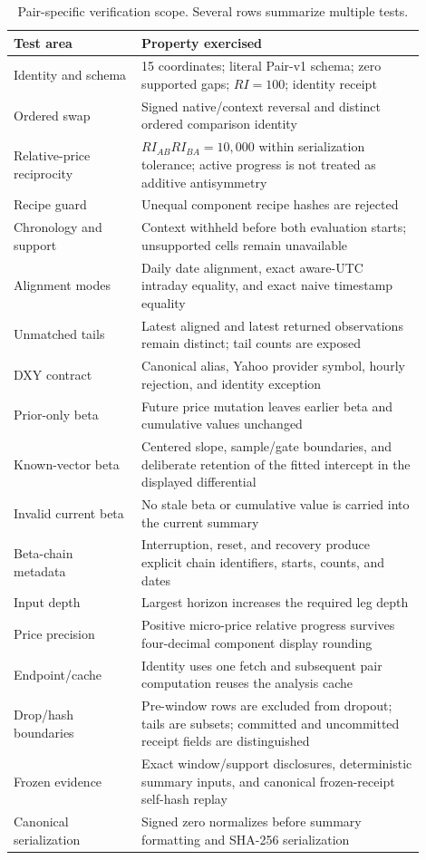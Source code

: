 \documentclass{article}
\begin{document}
\begin{table}[h]
\centering
\small
\setlength{\tabcolsep}{4pt}
\begin{tabular}{p{0.28\linewidth}p{0.62\linewidth}}
\toprule
Test area & Property exercised \\
\midrule
Identity and schema & 15 coordinates; literal Pair-v1 schema; zero supported gaps; $RI=100$; identity receipt \\
Ordered swap & Signed native/context reversal and distinct ordered comparison identity \\
Relative-price reciprocity & $RI_{AB}RI_{BA}=10{,}000$ within serialization tolerance; active progress is not treated as additive antisymmetry \\
Recipe guard & Unequal component recipe hashes are rejected \\
Chronology and support & Context withheld before both evaluation starts; unsupported cells remain unavailable \\
Alignment modes & Daily date alignment, exact aware-UTC intraday equality, and exact naive timestamp equality \\
Unmatched tails & Latest aligned and latest returned observations remain distinct; tail counts are exposed \\
DXY contract & Canonical alias, Yahoo provider symbol, hourly rejection, and identity exception \\
Prior-only beta & Future price mutation leaves earlier beta and cumulative values unchanged \\
Known-vector beta & Centered slope, sample/gate boundaries, and deliberate retention of the fitted intercept in the displayed differential \\
Invalid current beta & No stale beta or cumulative value is carried into the current summary \\
Beta-chain metadata & Interruption, reset, and recovery produce explicit chain identifiers, starts, counts, and dates \\
Input depth & Largest horizon increases the required leg depth \\
Price precision & Positive micro-price relative progress survives four-decimal component display rounding \\
Endpoint/cache & Identity uses one fetch and subsequent pair computation reuses the analysis cache \\
Drop/hash boundaries & Pre-window rows are excluded from dropout; tails are subsets; committed and uncommitted receipt fields are distinguished \\
Frozen evidence & Exact window/support disclosures, deterministic summary inputs, and canonical frozen-receipt self-hash replay \\
Canonical serialization & Signed zero normalizes before summary formatting and SHA-256 serialization \\
\bottomrule
\end{tabular}
\caption{Pair-specific verification scope. Several rows summarize multiple tests.}
\label{tab:tests}
\end{table}
\end{document}
